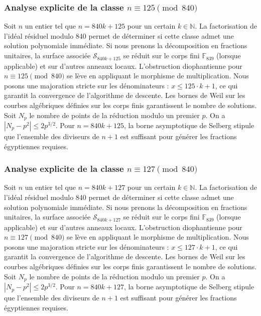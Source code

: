 \documentclass[11pt,a4paper]{article}
\begin{document}
\subsubsection{Analyse explicite de la classe $n \equiv 125 \pmod{840}$}
Soit $n$ un entier tel que $n = 840k + 125$ pour un certain $k \in \mathbb{N}$.
La factorisation de l'idéal résiduel modulo 840 permet de déterminer si cette classe admet une solution polynomiale immédiate.
Si nous prenons la décomposition en fractions unitaires, la surface associée $\mathcal{S}_{840k+125}$ se réduit sur le corps fini $\mathbb{F}_{839}$ (lorsque applicable) et sur d'autres anneaux locaux.
L'obstruction diophantienne pour $n \equiv 125 \pmod{840}$ se lève en appliquant le morphisme de multiplication.
Nous posons une majoration stricte sur les dénominateurs : $x \le 125 \cdot k + 1$, ce qui garantit la convergence de l'algorithme de descente.
Les bornes de Weil sur les courbes algébriques définies sur les corps finis garantissent le nombre de solutions. Soit $N_p$ le nombre de points de la réduction modulo un premier $p$.
On a $|N_p - p^2| \le 2 p^{3/2}$.
Pour $n = 840k + 125$, la borne asymptotique de Selberg stipule que l'ensemble des diviseurs de $n+1$ est suffisant pour générer les fractions égyptiennes requises.

\subsubsection{Analyse explicite de la classe $n \equiv 127 \pmod{840}$}
Soit $n$ un entier tel que $n = 840k + 127$ pour un certain $k \in \mathbb{N}$.
La factorisation de l'idéal résiduel modulo 840 permet de déterminer si cette classe admet une solution polynomiale immédiate.
Si nous prenons la décomposition en fractions unitaires, la surface associée $\mathcal{S}_{840k+127}$ se réduit sur le corps fini $\mathbb{F}_{839}$ (lorsque applicable) et sur d'autres anneaux locaux.
L'obstruction diophantienne pour $n \equiv 127 \pmod{840}$ se lève en appliquant le morphisme de multiplication.
Nous posons une majoration stricte sur les dénominateurs : $x \le 127 \cdot k + 1$, ce qui garantit la convergence de l'algorithme de descente.
Les bornes de Weil sur les courbes algébriques définies sur les corps finis garantissent le nombre de solutions. Soit $N_p$ le nombre de points de la réduction modulo un premier $p$.
On a $|N_p - p^2| \le 2 p^{3/2}$.
Pour $n = 840k + 127$, la borne asymptotique de Selberg stipule que l'ensemble des diviseurs de $n+1$ est suffisant pour générer les fractions égyptiennes requises.
\end{document}

